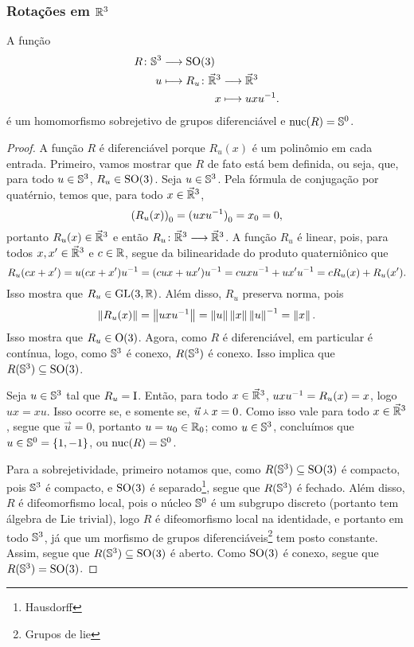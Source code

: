 \subsubsection{Rotações em \ensuremath{\R^3}}

\begin{proposition}
A função
	\begin{align*}
	\func{R}{\S^3}{\SO(3)}{u}{
		\begin{aligned}[t]
		\func{R_u}{\vec{\R}^3}{\vec{\R}^3}{x}{uxu\inv}.
		\end{aligned}
	}
	\end{align*}
é um homomorfismo sobrejetivo de grupos diferenciável e $\nuc(R)=\S^0$.
\end{proposition}
\begin{proof}
A função $R$ é diferenciável porque $R_u(x)$ é um polinômio em cada entrada. Primeiro, vamos mostrar que $R$ de fato está bem definida, ou seja, que, para todo $u \in \S^3$, $R_u \in \SO(3)$. Seja $u \in \S^3$. Pela fórmula de conjugação por quatérnio, temos que, para todo $x \in \vec{\R}^3$,
	\begin{equation*}
	\esc{(R_u(x))} = \esc{(uxu\inv)} = \esc{x} = 0,
	\end{equation*}
portanto $R_u(x) \in \vec{\R}^3$ e então $\fun{R_u}{\vec{\R}^3}{\vec{\R}^3}$. A função $R_u$ é linear, pois, para todos $x,x' \in \vec{\R}^3$ e $c \in \R$, segue da bilinearidade do produto quaterniônico que
	\begin{equation*}
	R_u(cx+x') = u(cx+x')u\inv = (cux+ux')u\inv = cuxu\inv + ux'u\inv = cR_u(x) + R_u(x').
	\end{equation*}
Isso mostra que $R_u \in \GL(3,\R)$. Além disso, $R_u$ preserva norma, pois
	\begin{equation*}
	\nor{R_u(x)} = \nor{uxu\inv} = \nor{u}\nor{x}\nor{u}\inv = \nor{x}.
	\end{equation*}
Isso mostra que $R_u \in \OO(3)$. Agora, como $R$ é diferenciável, em particular é contínua, logo, como $\S^3$ é conexo, $R(\S^3)$ é conexo. Isso implica que $R(\S^3) \subseteq \SO(3)$.

Seja $u \in \S^3$ tal que $R_u=\Id$. Então, para todo $x \in \vec{\R}^3$, $uxu\inv = R_u(x) = x$, logo $ux=xu$. Isso ocorre se, e somente se, $\pvec{\vec{u}}{x} = 0$. Como isso vale para todo $x \in \vec{\R}^3$, segue que $\vec{u}=0$, portanto $u=\esc{u} \in \esc{\R}$; como $u \in \S^3$, concluímos que $u \in \S^0 = \{1,-1\}$, ou $\nuc(R) = \S^0$.

Para a sobrejetividade, primeiro notamos que, como $R(\S^3) \subseteq \SO(3)$ é compacto, pois $\S^3$ é compacto, e $\SO(3)$ é separado\footnote{Hausdorff}, segue que $R(\S^3)$ é fechado. Além disso, $R$ é difeomorfismo local, pois o núcleo $\S^0$ é um subgrupo discreto (portanto tem álgebra de Lie trivial), logo $R$ é difeomorfismo local na identidade, e portanto em todo $\S^3$, já que um morfismo de grupos diferenciáveis\footnote{Grupos de lie} tem posto constante. Assim, segue que $R(\S^3) \subseteq \SO(3)$ é aberto. Como $\SO(3)$ é conexo, segue que $R(\S^3) = \SO(3)$.
\end{proof}

